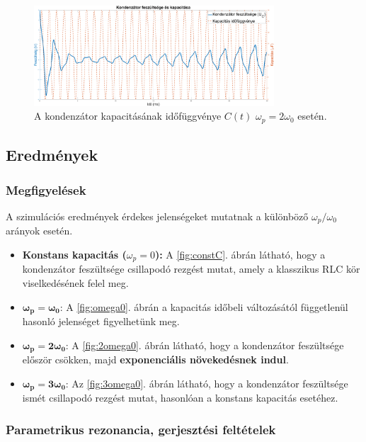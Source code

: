\documentclass[12pt,a4paper]{article}
\begin{document}
\begin{figure}[H]
    \centering
    \includegraphics[width=0.8\textwidth]{figures/ctplot.png}
    \caption{A kondenzátor kapacitásának időfüggvénye $C(t)$ $\omega_p = 2\omega_0$ esetén.}
    \label{fig:ctplot}
\end{figure}

\subsection{Eredmények}

\subsubsection{Megfigyelések}

A szimulációs eredmények érdekes jelenségeket mutatnak a különböző $\omega_p / \omega_0$ arányok esetén.

\begin{itemize}
    \item \textbf{Konstans kapacitás ($\omega_p = 0$):} A \ref{fig:constC}. ábrán látható, hogy a kondenzátor feszültsége csillapodó rezgést mutat, amely a klasszikus RLC kör viselkedésének felel meg.
    \item $\boldsymbol{\omega_p = \omega_0}$: A \ref{fig:omega0}. ábrán a kapacitás időbeli változásától függetlenül hasonló jelenséget figyelhetünk meg.
    \item $\boldsymbol{\omega_p = 2\omega_0}$: A \ref{fig:2omega0}. ábrán látható, hogy a kondenzátor feszültsége először csökken, majd \textbf{exponenciális növekedésnek indul}.
    \item $\boldsymbol{\omega_p = 3\omega_0}$: Az \ref{fig:3omega0}. ábrán látható, hogy a kondenzátor feszültsége ismét csillapodó rezgést mutat, hasonlóan a konstans kapacitás esetéhez.
\end{itemize}

\subsubsection{Parametrikus rezonancia, gerjesztési feltételek}
\end{document}
